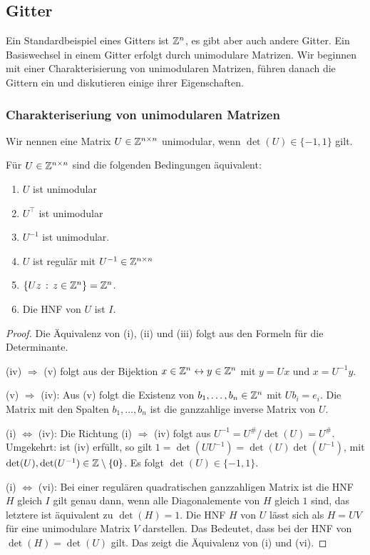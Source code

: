 	\subsection{Gitter} 
	
	Ein Standardbeispiel eines Gitters ist $\mathbb Z^n$, es gibt aber auch andere Gitter. Ein Basiswechsel in einem Gitter erfolgt durch unimodulare Matrizen. Wir beginnen mit einer Charakterisierung von unimodularen Matrizen, führen  danach die Gittern ein und diskutieren einige ihrer Eigenschaften. 
	
	\subsubsection{Charakteriseriung von unimodularen Matrizen} 
	
	Wir nennen eine Matrix $U \in \mathbb Z^{n \times n}$ unimodular, wenn $\det(U) \in \{-1,1\}$ gilt. 
	
	\begin{thm}
		Für $U \in \mathbb Z^{n \times n}$ sind die folgenden Bedingungen äquivalent: 
		\begin{enumerate}
			\item $U$ ist unimodular
			\item $U^\top$ ist unimodular 
			\item $U^{-1}$ ist unimodular. 
			\item $U$ ist regulär mit $U^{-1} \in \mathbb Z^{n \times n}$
			\item $\{ Uz \,:\, z \in \mathbb Z^n\} = \mathbb Z^n$. 
			\item Die HNF von $U$ ist $I$. 
		\end{enumerate} 
	\end{thm} 
	\begin{proof}
		Die Äquivalenz von (i), (ii) und (iii) folgt aus den Formeln für die Determinante. 
		
		(iv) $\Rightarrow$ (v) folgt aus der Bijektion $x  \in \mathbb Z^n \leftrightarrow y \in \mathbb Z^n$ mit $y = U x$ und $x = U^{-1} y$. 
		
		(v) $\Rightarrow$ (iv): Aus (v) folgt die Existenz von $b_1,\ldots,b_n \in \mathbb Z^n$ mit $U b_i = e_i$. Die Matrix mit den Spalten $b_1,\ldots,b_n$ ist die ganzzahlige inverse Matrix von $U$. 
		
		(i) $\Leftrightarrow$ (iv): Die Richtung (i) $\Rightarrow$ (iv) folgt aus $U^{-1} = U^{\#} / \det(U) = U^{\#}$. Umgekehrt: ist (iv) erfüllt, so gilt $1= \det(U U^{-1} ) = \det(U) \det(U^{-1})$, mit $\det(U), \det(U^{-1}) \in \mathbb Z \setminus \{0\}$. Es folgt $\det(U) \in \{-1,1\}$. 
		
		(i) $\Leftrightarrow$ (vi): Bei einer regulären quadratischen ganzzahligen Matrix ist die HNF $H$ gleich $I$ gilt genau dann, wenn alle Diagonalemente von $H$ gleich $1$ sind, das letztere ist äquivalent zu $\det(H)=1$. Die HNF $H$ von $U$ lässt sich als $H = U V$ für eine unimodulare Matrix $V$ darstellen. Das Bedeutet, dass bei der HNF von $\det(H) = \det(U)$ gilt. Das zeigt die Äquivalenz von (i) und (vi).   
	\end{proof} 
	
